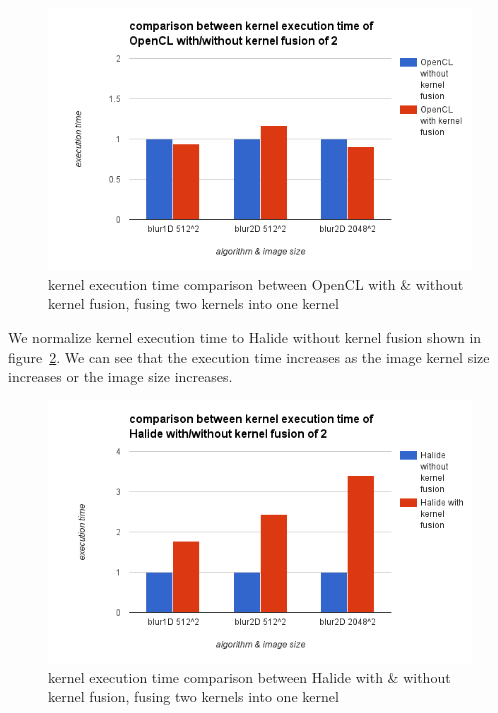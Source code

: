 \begin{figure}[hbtp]
\centering
\includegraphics[width=14cm]{img/OpenCL-with-without-execute-2ker.png}
\caption{kernel execution time comparison between OpenCL with \& without kernel fusion, fusing two kernels into one kernel}
\label{fig:my_label_ex_3}
\end{figure}

    We normalize kernel execution time to Halide without kernel fusion shown in figure~\ref{fig:my_label_ex_4}. We can see that the execution time increases as the image kernel size increases or the image size increases.

\begin{figure}[hbtp]
\centering
\includegraphics[width=14cm]{img/Halide-with-without-execute-2ker.png}
\caption{kernel execution time comparison between Halide with \& without kernel fusion, fusing two kernels into one kernel}
\label{fig:my_label_ex_4}
\end{figure}

